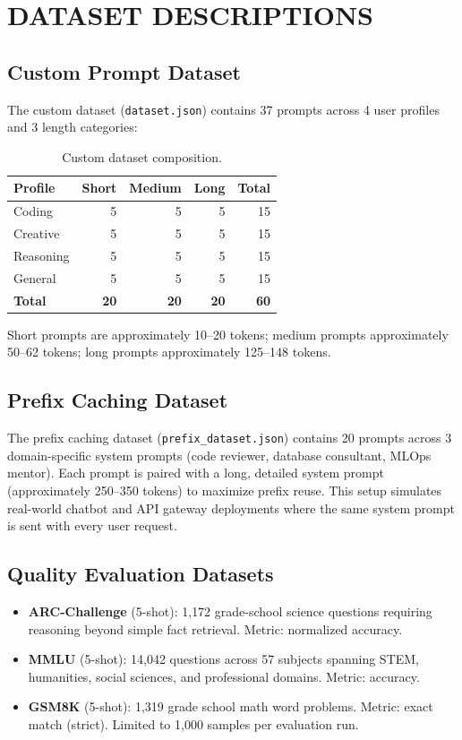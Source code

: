 \documentclass[a4paper,12pt]{report}
\begin{document}
\chapter{DATASET DESCRIPTIONS}

\section{Custom Prompt Dataset}

The custom dataset (\texttt{dataset.json}) contains 37 prompts across 4 user profiles and 3 length categories:

\begin{table}[h!]
\caption{Custom dataset composition.}
\centering
\begin{tabular}{|l|r|r|r|r|}
\hline
\textbf{Profile} & \textbf{Short} & \textbf{Medium} & \textbf{Long} & \textbf{Total} \\
\hline
Coding & 5 & 5 & 5 & 15 \\
Creative & 5 & 5 & 5 & 15 \\
Reasoning & 5 & 5 & 5 & 15 \\
General & 5 & 5 & 5 & 15 \\
\hline
\textbf{Total} & \textbf{20} & \textbf{20} & \textbf{20} & \textbf{60} \\
\hline
\end{tabular}
\end{table}

Short prompts are approximately 10--20 tokens; medium prompts approximately 50--62 tokens; long prompts approximately 125--148 tokens.

\section{Prefix Caching Dataset}

The prefix caching dataset (\texttt{prefix\_dataset.json}) contains 20 prompts across 3 domain-specific system prompts (code reviewer, database consultant, MLOps mentor). Each prompt is paired with a long, detailed system prompt (approximately 250--350 tokens) to maximize prefix reuse. This setup simulates real-world chatbot and API gateway deployments where the same system prompt is sent with every user request.

\section{Quality Evaluation Datasets}

\begin{itemize}
    \item \textbf{ARC-Challenge} (5-shot): 1{,}172 grade-school science questions requiring reasoning beyond simple fact retrieval. Metric: normalized accuracy.
    \item \textbf{MMLU} (5-shot): 14{,}042 questions across 57 subjects spanning STEM, humanities, social sciences, and professional domains. Metric: accuracy.
    \item \textbf{GSM8K} (5-shot): 1{,}319 grade school math word problems. Metric: exact match (strict). Limited to 1{,}000 samples per evaluation run.
\end{itemize}
\end{document}
